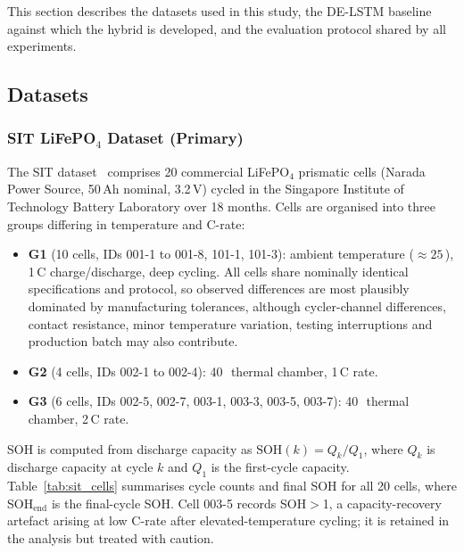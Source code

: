 This section describes the datasets used in this study, the DE-LSTM baseline
against which the hybrid is developed, and the evaluation protocol shared by all
experiments.

\subsection{Datasets}\label{sec:datasets}

\subsubsection{SIT LiFePO$_4$ Dataset (Primary)}
The SIT dataset~\cite{ponnambalam2026sitdata} comprises 20 commercial
LiFePO$_4$ prismatic cells (Narada Power Source, 50\,Ah nominal, 3.2\,V)
cycled in the Singapore Institute of Technology Battery Laboratory over
18 months.
Cells are organised into three groups differing in temperature and C-rate:
\begin{itemize}
  \item \textbf{G1} (10 cells, IDs 001-1 to 001-8, 101-1, 101-3):
        ambient temperature (${\approx}25$\,\textcelsius), 1\,C charge/discharge,
        deep cycling. All cells share nominally identical specifications
        and protocol, so observed differences are most plausibly dominated by
        manufacturing tolerances, although cycler-channel differences, contact
        resistance, minor temperature variation, testing interruptions and
        production batch may also contribute.
  \item \textbf{G2} (4 cells, IDs 002-1 to 002-4):
        40\,\textcelsius\ thermal chamber, 1\,C rate.
  \item \textbf{G3} (6 cells, IDs 002-5, 002-7, 003-1, 003-3, 003-5, 003-7):
        40\,\textcelsius\ thermal chamber, 2\,C rate.
\end{itemize}
SOH is computed from discharge capacity as
$\text{SOH}(k) = Q_k / Q_1$,
where $Q_k$ is discharge capacity at cycle $k$ and $Q_1$ is the first-cycle
capacity.
Table~\ref{tab:sit_cells} summarises cycle counts and final SOH for all
20 cells, where SOH$_\text{end}$ is the final-cycle SOH.
Cell 003-5 records SOH$>$1, a capacity-recovery artefact arising at low C-rate
after elevated-temperature cycling; it is retained in the analysis but treated
with caution.


